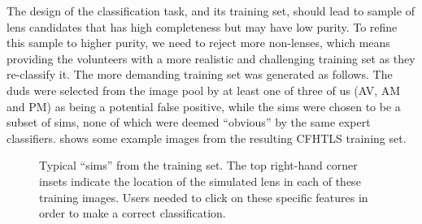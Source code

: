 \documentclass[useAMS,usenatbib,a4paper]{mn2e}
\begin{document}
The design of the \StageOne classification task, and its training set, should lead
to sample of lens candidates that has high completeness but may have low purity.
To refine this sample to higher purity, we need to reject more non-lenses, which
means providing the volunteers with a more realistic and challenging training
set as they re-classify it. The more demanding \StageTwo training set was
generated as follows. The \StageTwo duds were selected from the image pool by at
least one of three of us  (AV, AM and PM) as being a potential false positive,
while the \StageTwo sims were chosen to be a subset of \StageOne sims, none of which
were deemed ``obvious'' by the same expert classifiers.
 shows some example images from the resulting CFHTLS
\StageTwo training set.


\begin{figure}%
\begin{minipage}[b]{0.24\linewidth}
\centering{}
\end{minipage} \hfill
\begin{minipage}[b]{0.24\linewidth}
\centering{}
\end{minipage} \hfill
\begin{minipage}[b]{0.24\linewidth}
\centering{}
\end{minipage} \hfill
\begin{minipage}[b]{0.24\linewidth}
\centering{}
\end{minipage} \hfill
\caption{Typical \SW ``sims'' from the \StageTwo training set. The top right-hand corner insets indicate the
location of the simulated lens in each of these training images. Users needed to
click on these specific features in order to make a correct classification.}
\label{fig:training-gallery:sims}
\end{figure}
\end{document}
